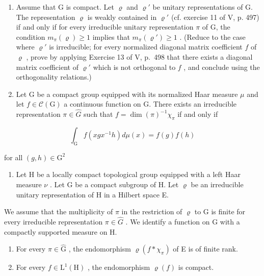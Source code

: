 \begin{enumerate}
\def\labelenumi{\arabic{enumi})}
\setcounter{enumi}{17}
\item
  Assume that G is compact. Let \(\varrho\) and \(\varrho'\) be unitary representations of G. The representation \(\varrho\) is weakly contained in \(\varrho'\) (cf. exercise 11 of V, p. 497) if and only if for every irreducible unitary representation \(\pi\) of G, the condition \(m_{\pi}(\varrho) \geqslant 1\) implies that \(m_{\pi}(\varrho') \geqslant 1\) . (Reduce to the case where \(\varrho'\) is irreducible; for every normalized diagonal matrix coefficient \(f\) of \(\varrho\) , prove by applying Exercise 13 of V, p.~498 that there exists a diagonal matrix coefficient of \(\varrho'\) which is not orthogonal to \(f\) , and conclude using the orthogonality relations.)
\item
  Let G be a compact group equipped with its normalized Haar measure \(\mu\) and let \(f \in \mathcal{C}(\mathrm{G})\) a continuous function on G. There exists an irreducible representation \(\pi \in \widehat{G}\) such that \(f = \dim(\pi)^{-1}\chi_{\pi}\) if and only if
\end{enumerate}

\[
\int_ {\mathrm{G}} f (x g x ^ {- 1} h) d \mu (x) = f (g) f (h)
\]

for all \((g,h)\in \mathrm{G}^2\)

\begin{enumerate}
\def\labelenumi{\arabic{enumi})}
\setcounter{enumi}{19}
\tightlist
\item
  Let H be a locally compact topological group equipped with a left Haar measure \(\nu\) . Let G be a compact subgroup of H. Let \(\varrho\) be an irreducible unitary representation of H in a Hilbert space E.
\end{enumerate}

We assume that the multiplicity of \(\pi\) in the restriction of \(\varrho\) to G is finite for every irreducible representation \(\pi \in \widehat{G}\) . We identify a function on G with a compactly supported measure on H.

\begin{enumerate}
\def\labelenumi{\alph{enumi})}
\item
  For every \(\pi \in \widehat{\mathrm{G}}\) , the endomorphism \(\varrho(f * \chi_{\pi})\) of E is of finite rank.
\item
  For every \(f \in \mathrm{L}^{1}(\mathrm{H})\) , the endomorphism \(\varrho(f)\) is compact.
\end{enumerate}

